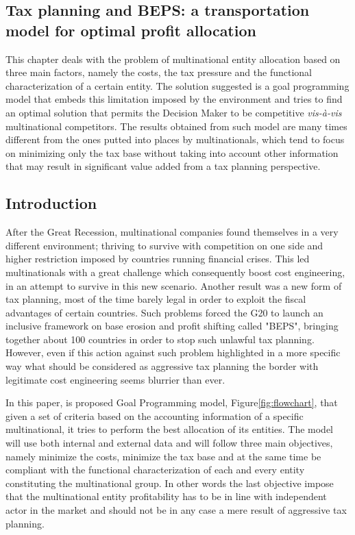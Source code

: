 \begin{doublespace}
\chapter{Tax planning and BEPS: a transportation model for optimal profit allocation}
This chapter deals with the problem of multinational entity allocation based on three main factors, namely the costs, the tax pressure and the functional characterization of a certain entity. The solution suggested is a goal programming model that embeds this limitation imposed by the environment and tries to find an optimal solution that permits the Decision Maker to be competitive \textit{vis-à-vis} multinational competitors. The results obtained from such model are many times different from the ones putted into places by multinationals, which tend to focus on minimizing only the tax base without taking into account other information that may result in significant value added from a tax planning perspective. 

\section{Introduction}
After the Great Recession, multinational companies found themselves in a very different environment; thriving to survive with competition on one side and higher restriction imposed by countries running financial crises. This led multinationals with a great challenge which consequently boost cost engineering, in an attempt to survive in this new scenario. Another result was a new form of tax planning, most of the time barely legal in order to exploit the fiscal advantages of certain countries\cite{After_tax_hedging_report_2013}. Such problems forced the G20 to launch an inclusive framework on base erosion and profit shifting called "BEPS", bringing together about 100 countries in order to stop such unlawful tax planning. However, even if this action against such problem highlighted in a more specific way what should be considered as aggressive tax planning the border with legitimate cost engineering seems blurrier than ever\cite{Feller2017}.

In this paper, is proposed Goal Programming model, Figure\ref{fig:flowchart}, that given a set of criteria based on the accounting information of a specific multinational, it tries to perform the best allocation of its entities. The model will use both internal and external data and will follow three main objectives, namely minimize the costs, minimize the tax base and at the same time be compliant with the functional characterization of each and every entity constituting the multinational group. In other words the last objective impose that the multinational entity profitability has to be in line with independent actor in the market\cite{Model_Tax_Convention_2015} and should not be in any case a mere result of aggressive tax planning.


\end{doublespace}
